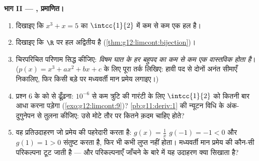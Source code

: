 \begin{problem}
\medskip
\noindent\textbf{भाग II --- , प्रमाणित।}
\begin{enumerate}[resume]
  \item दिखाइए कि  $x^3 + x = 5$ का $\intcc{1}{2}$ में कम से कम एक हल है।
  \item दिखाइए कि $\R$ पर हल अद्वितीय है (\cref{thm:g12:limcont:bijection})।
  \item चिरपरिचित परिणाम सिद्ध कीजिए: \emph{विषम घात के हर बहुपद का कम से
        कम एक वास्तविक  होता है}। ($p(x) = x^3 + a x^2 + b x + c$ के लिए पूरा तर्क लिखिए: हावी पद
        से दोनों अनंत सीमाएँ निकालिए, फिर किसी बड़े  पर मध्यवर्ती मान
        प्रमेय लगाइए।)
  \item प्रश्न 6 के  को  से ढूँढ़ना: $10^{-6}$ से कम त्रुटि की
        गारंटी के लिए $\intcc{1}{2}$ को कितनी बार आधा करना पड़ेगा (\cref{exo:g12:limcont:9})? \cref{pb:g11:deriv:1} की
        न्यूटन विधि के अंक-दुगुनेपन से तुलना कीजिए: उसे मोटे तौर पर कितने
        क़दम चाहिए होते?
  \item वह प्रतिउदाहरण जो प्रमेय की पहरेदारी करता है: $g(x) = \frac1x$ $g(-1) = -1 < 0$ और $g(1) = 1 > 0$
        संतुष्ट करता है, फिर भी कभी लुप्त नहीं होता। मध्यवर्ती मान प्रमेय
        की कौन-सी परिकल्पना टूट जाती है --- और परिकल्पनाएँ जाँचने के बारे
        में यह उदाहरण क्या सिखाता है?
\end{enumerate}


\end{problem}
